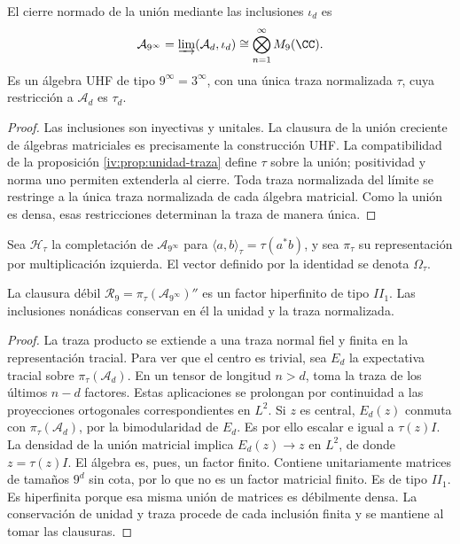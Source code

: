\begin{theorem}
\label{iv:thm:uhf}
El cierre normado de la unión mediante las inclusiones \(\iota_d\)
es
\[
 \mathcal A_{9^\infty}
 =\varinjlim(\mathcal A_d,\iota_d)
 \cong\bigotimes_{n=1}^{\infty}M_9(\CC).
\]
Es un álgebra UHF de tipo \(9^\infty=3^\infty\), con una única
traza normalizada \(\tau\), cuya restricción a \(\mathcal A_d\)
es \(\tau_d\).
\end{theorem}
\begin{proof}
Las inclusiones son inyectivas y unitales. La clausura de la unión
creciente de álgebras matriciales es precisamente la construcción UHF.
La compatibilidad de la proposición \ref{iv:prop:unidad-traza}
define \(\tau\) sobre la unión; positividad y norma uno permiten
extenderla al cierre. Toda traza normalizada del límite se restringe
a la única traza normalizada de cada álgebra matricial. Como la unión
es densa, esas restricciones determinan la traza de manera única.
\end{proof}

Sea \(\mathcal H_\tau\) la completación de
\(\mathcal A_{9^\infty}\) para
\(\langle a,b\rangle_\tau=\tau(a^*b)\), y sea \(\pi_\tau\)
su representación por multiplicación izquierda. El vector definido
por la identidad se denota \(\Omega_\tau\).

\begin{theorem}
\label{iv:thm:factor-tracial}
La clausura débil
\(\mathcal R_9=\pi_\tau(\mathcal A_{9^\infty})''\)
es un factor hiperfinito de tipo \(II_1\). Las inclusiones
nonádicas conservan en él la unidad y la traza normalizada.
\end{theorem}
\begin{proof}
La traza producto se extiende a una traza normal fiel y finita
en la representación tracial. Para ver que el centro es trivial,
sea \(E_d\) la expectativa tracial sobre \(\pi_\tau(\mathcal A_d)\).
En un tensor de longitud \(n>d\), toma la traza de los últimos
\(n-d\) factores. Estas aplicaciones se prolongan por continuidad
a las proyecciones ortogonales correspondientes en \(L^2\).
Si \(z\) es central, \(E_d(z)\) conmuta con
\(\pi_\tau(\mathcal A_d)\), por la bimodularidad de \(E_d\).
Es por ello escalar e igual a \(\tau(z)I\). La densidad de la
unión matricial implica \(E_d(z)\to z\) en \(L^2\), de donde
\(z=\tau(z)I\). El álgebra es, pues, un factor finito.
Contiene unitariamente matrices de tamaños \(9^d\) sin cota,
por lo que no es un factor matricial finito. Es de tipo \(II_1\).
Es hiperfinita porque esa misma unión de matrices es débilmente
densa. La conservación de unidad y traza procede de cada inclusión
finita y se mantiene al tomar las clausuras.
\end{proof}


